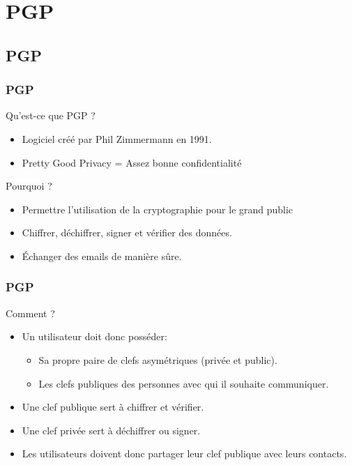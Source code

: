 \section{PGP}
\subsection{PGP}
\begin{frame}
    \frametitle{\color{white}PGP}
    \begin{block}{Qu'est-ce que PGP ?}
      \begin{itemize}
       \item Logiciel créé par Phil Zimmermann en 1991.
         \item Pretty Good Privacy = Assez bonne confidentialité
       \end{itemize} 
    \end{block}
    \begin{block}{Pourquoi ?}
      \begin{itemize}
         \item Permettre l'utilisation de la cryptographie pour le grand public
         \item Chiffrer, déchiffrer, signer et vérifier des données. 
         \item Échanger des emails de manière sûre.
       \end{itemize} 
    \end{block}
\end{frame}
\begin{frame}
    \frametitle{\color{white}PGP}
    \begin{block}{Comment ?}
    	\begin{itemize}
         \item Un utilisateur doit donc posséder:
	  \begin{itemize}
	    \item Sa propre paire de clefs asymétriques (privée et public).
	    \item Les clefs publiques des personnes avec qui il souhaite communiquer. 
	  \end{itemize}
	 \item Une clef publique sert à chiffrer et vérifier.
	 \item Une clef privée sert à déchiffrer ou signer.
	 \item Les utilisateurs doivent donc partager leur clef publique avec leurs contacts.
       \end{itemize} 
    \end{block}
\end{frame}

